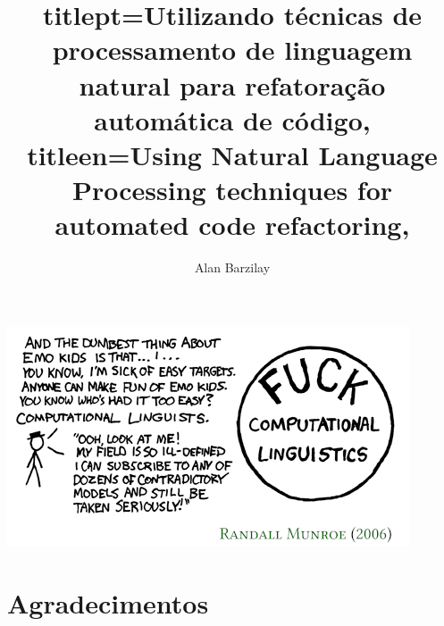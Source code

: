 \documentclass[12pt,twoside,brazilian,english]{book}
\title{
    titlept={Utilizando técnicas de processamento de linguagem natural para refatoração automática de código},
    titleen={Using Natural Language Processing techniques for automated code refactoring},
}
\author{Alan Barzilay}
\begin{document}

\frontmatter

\pagestyle{plain}

\onehalfspacing %

\maketitle %


\begin{dedicatoria}
\href{https://xkcd.com/114/}{\includegraphics[scale=0.85]{figuras/xkcd.png} }
\nocite{xkcd}
\label{xkcd}
\end{dedicatoria}


\chapter*{Agradecimentos}
\end{document}
